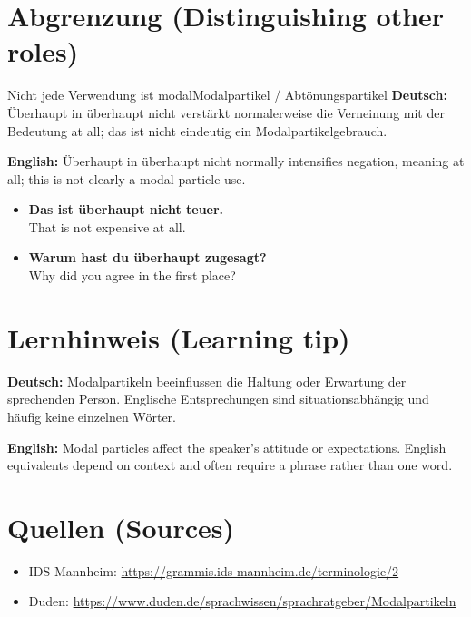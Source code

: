 \documentclass[a4paper,11pt]{article}
\newcommand{\GermanText}[1]{\textbf{Deutsch: }#1\par}
\newcommand{\EnglishText}[1]{{\small\color{SoftGray}\textbf{English: }#1\par}}
\newcommand{\ExampleItem}[2]{\item \textbf{#1}\\{\small\color{SoftGray}#2}}
\begin{document}
\section{Abgrenzung \textnormal{(Distinguishing other roles)}}
\begin{grammarentry}{Nicht jede Verwendung ist modal}{Modalpartikel / Abtönungspartikel}
\GermanText{Überhaupt in überhaupt nicht verstärkt normalerweise die Verneinung mit der Bedeutung at all; das ist nicht eindeutig ein Modalpartikelgebrauch.}
\EnglishText{Überhaupt in überhaupt nicht normally intensifies negation, meaning at all; this is not clearly a modal-particle use.}
\end{grammarentry}
\begin{exbox}\begin{itemize}
\ExampleItem{Das ist überhaupt nicht teuer.}{That is not expensive at all.}
\ExampleItem{Warum hast du überhaupt zugesagt?}{Why did you agree in the first place?}
\end{itemize}\end{exbox}
\section{Lernhinweis \textnormal{(Learning tip)}}
\GermanText{Modalpartikeln beeinflussen die Haltung oder Erwartung der sprechenden Person. Englische Entsprechungen sind situationsabhängig und häufig keine einzelnen Wörter.}
\EnglishText{Modal particles affect the speaker's attitude or expectations. English equivalents depend on context and often require a phrase rather than one word.}
\section{Quellen \textnormal{(Sources)}}
\begin{itemize}
\item IDS Mannheim: \url{https://grammis.ids-mannheim.de/terminologie/2}
\item Duden: \url{https://www.duden.de/sprachwissen/sprachratgeber/Modalpartikeln}
\end{itemize}
\end{document}
